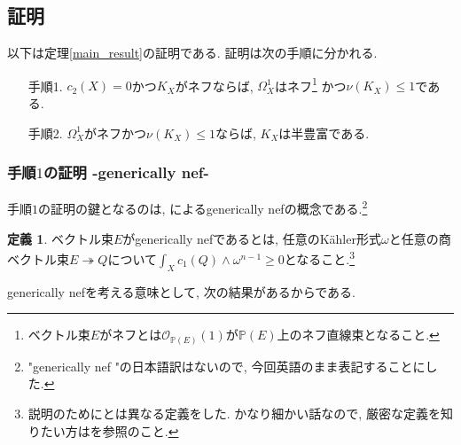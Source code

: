 \documentclass[12pt]{amsart}
\theoremstyle{definition}
\newtheorem{defn}[thm]{定義}
\theoremstyle{remark}
\begin{document}
\subsection{証明}
以下は定理\ref{main_result}の証明である. 証明は次の手順に分かれる.
\begin{enumerate}
\item[手順1.] $c_2(X)= 0$かつ$K_X$がネフならば, $\Omega_{X}^{1}$はネフ\footnote{ベクトル束$E$がネフとは$\mathcal{O}_{\mathbb{P}(E)}(1)$が$\mathbb{P}(E)$上のネフ直線束となること.}
かつ$\nu(K_X) \le 1$である.
\item[手順2.]$\Omega_{X}^{1}$がネフかつ$\nu(K_X) \le 1$ならば, $K_X$は半豊富である.
\end{enumerate}

\subsubsection{手順$1$の証明 -generically nef-}
手順$1$の証明の鍵となるのは, \cite{Peternell}によるgenerically nefの概念である.\footnote{"generically nef "の日本語訳はないので, 今回英語のまま表記することにした.}
\begin{defn}
ベクトル束$E$がgenerically nefであるとは, 任意のK\"ahler形式$\omega$と任意の商ベクトル束$E\twoheadrightarrow Q$について$\int_{X} c_1(Q)\wedge  \omega^{n-1} \ge0$となること.\footnote{説明のために\cite{Peternell}とは異なる定義をした. かなり細かい話なので, 厳密な定義を知りたい方は\cite{Peternell}を参照のこと.}
\end{defn}
generically nefを考える意味として, 次の結果があるからである.
\end{document}

